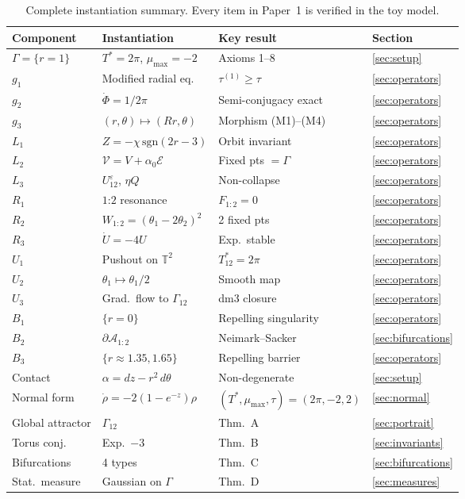 \documentclass[12pt, oneside]{book}
\theoremstyle{plain}
\theoremstyle{definition}
\theoremstyle{remark}
\newcommand{\T}{\mathbb{T}}
\newcommand{\Orb}{\Gamma}
\newcommand{\eps}{\varepsilon}
\begin{document}
\begin{table}[ht]
\centering
\begin{tabular}{@{}llll@{}}
\toprule
Component & Instantiation & Key result & Section\\
\midrule
$\Orb=\{r=1\}$ & $T^*=2\pi$, $\mu_{\max}=-2$ & Axioms 1--8 & \ref{sec:setup}\\
$g_1$ & Modified radial eq. & $\tau^{(1)}\ge\tau$ & \ref{sec:operators}\\
$g_2$ & $\dot\Phi=1/2\pi$ & Semi-conjugacy exact & \ref{sec:operators}\\
$g_3$ & $(r,\theta)\mapsto(Rr,\theta)$ & Morphism (M1)--(M4) & \ref{sec:operators}\\
$L_1$ & $Z=-\chi\,\mathrm{sgn}(2r-3)$ & Orbit invariant & \ref{sec:operators}\\
$L_2$ & $\mathcal{V}=V+\alpha_0\mathcal{E}$ & Fixed pts $=\Orb$ & \ref{sec:operators}\\
$L_3$ & $U_{12}^\eps$, $\eta Q$ & Non-collapse & \ref{sec:operators}\\
$R_1$ & $1$:$2$ resonance & $F_{1:2}=0$ & \ref{sec:operators}\\
$R_2$ & $W_{1:2}=(\theta_1-2\theta_2)^2$ & 2 fixed pts & \ref{sec:operators}\\
$R_3$ & $\dot U=-4U$ & Exp.\ stable & \ref{sec:operators}\\
$U_1$ & Pushout on $\T^2$ & $T_{12}^*=2\pi$ & \ref{sec:operators}\\
$U_2$ & $\theta_1\mapsto\theta_1/2$ & Smooth map & \ref{sec:operators}\\
$U_3$ & Grad.\ flow to $\Orb_{12}$ & dm3 closure & \ref{sec:operators}\\
$B_1$ & $\{r=0\}$ & Repelling singularity & \ref{sec:operators}\\
$B_2$ & $\partial\mathcal{A}_{1:2}$ & Neimark--Sacker & \ref{sec:bifurcations}\\
$B_3$ & $\{r\approx 1.35,1.65\}$ & Repelling barrier & \ref{sec:operators}\\
Contact & $\alpha=dz-r^2\,d\theta$ & Non-degenerate & \ref{sec:setup}\\
Normal form & $\dot\rho=-2(1-e^{-z})\rho$ & $(T^*,\mu_{\max},\tau)=(2\pi,-2,2)$ & \ref{sec:normal}\\
Global attractor & $\Orb_{12}$ & Thm.\ A & \ref{sec:portrait}\\
Torus conj. & Exp.\ $-3$ & Thm.\ B & \ref{sec:invariants}\\
Bifurcations & 4 types & Thm.\ C & \ref{sec:bifurcations}\\
Stat.\ measure & Gaussian on $\Orb$ & Thm.\ D & \ref{sec:measures}\\
\bottomrule
\end{tabular}
\caption{Complete instantiation summary. Every item in Paper~1 is
  verified in the toy model.}
\label{tab:summary}
\end{table}
\end{document}
